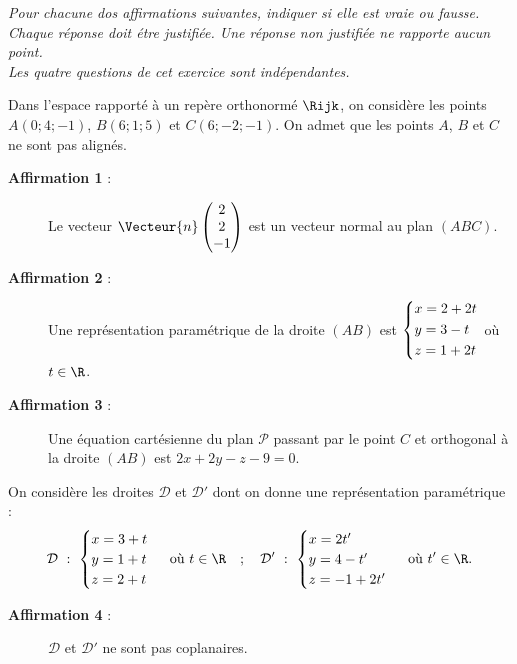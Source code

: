\textit{Pour chacune dos affirmations suivantes, indiquer si elle est vraie ou fausse. Chaque réponse doit étre justifiée. Une réponse non justifiée ne rapporte aucun point.\\
Les quatre questions de cet exercice sont indépendantes.}

\medskip

Dans l'espace rapporté à un repère orthonormé $\Rijk$, on considère les points $A(0;4;-1)$, $B(6;1;5)$ et $C(6;-2;-1)$. On admet que les points $A$, $B$ et $C$ ne sont pas alignés.

\begin{description}
	\item[\textbf{Affirmation 1} :] Le vecteur $\Vecteur{n}\begin{pmatrix}2\\2\\-1\end{pmatrix}$ est un vecteur normal au plan $(ABC)$.
	\item[\textbf{Affirmation 2} :] Une représentation paramétrique de la droite $(AB)$ est $\begin{dcases}x=2+2t\\y=3-t\\z=1+2t\end{dcases}$ où $t \in \R$.
	\item[\textbf{Affirmation 3} :] Une équation cartésienne du plan $\mathcal{P}$ passant par le point $C$ et orthogonal à la droite $(AB)$ est $2x+2y-z-9=0$.
\end{description}

On considère les droites $\mathcal{D}$ et $\mathcal{D}'$ dont on donne une représentation paramétrique : %
\[ \mathcal{D}~:~\begin{cases}x=3+t\\y=1+t\\z=2+t\end{cases}\text{ où } t \in \R \quad ; \quad \mathcal{D}'~:~\begin{cases}x=2t'\\y=4-t'\\z=-1+2t'\end{cases}\text{ où } t' \in \R. \]

\begin{description}
	\item[\textbf{Affirmation 4} :] $\mathcal{D}$ et $\mathcal{D}'$ ne sont pas coplanaires.
\end{description}